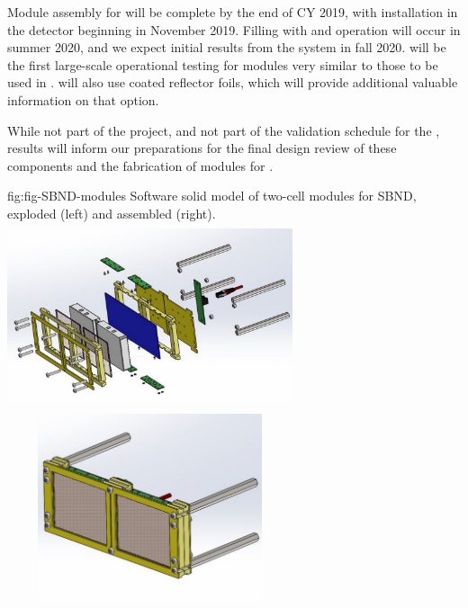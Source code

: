 Module assembly for  will be complete by the end of CY 2019, with installation in the detector beginning in November 2019.  Filling with  and operation will occur in summer 2020, and we expect initial results from the  system in fall 2020.   will be the first large-scale operational testing for  modules very similar to those to be used in .
 will also use coated reflector foils, which will provide additional valuable information on that   option.  

While not part of the  project, and not part of the validation schedule for the ,  results will inform our preparations for the final design review of these components and the fabrication of modules for .  


\begin{dunefigure}
 {fig:fig-SBND-modules}
 {Software solid model of two-cell  modules for SBND, exploded (left) and assembled (right).}
\includegraphics[angle=0,width=8.4cm,height=5.5cm]{graphics/pds-sbnd-xarapu-exploded.pdf}
\includegraphics[angle=0,width=8.4cm,height=5.5cm]{graphics/pds-sbnd-xarapu-assembled.pdf}
\end{dunefigure}


\subsubsection{}
\label{sec:valid-pdune2}

